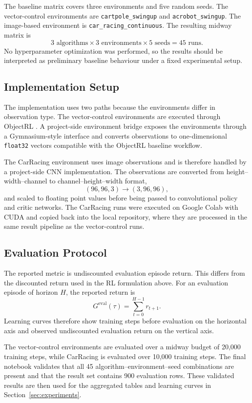 The baseline matrix covers three environments and five random seeds. The vector-control environments are \texttt{cartpole\_swingup} and \texttt{acrobot\_swingup}. The image-based environment is \texttt{car\_racing\_continuous}. The resulting midway matrix is
\[
3 \text{ algorithms} \times 3 \text{ environments} \times 5 \text{ seeds} = 45 \text{ runs}.
\]
No hyperparameter optimization was performed, so the results should be interpreted as preliminary baseline behaviour under a fixed experimental setup.

\subsection{Implementation Setup}
\label{sec:methodology-implementation}

The implementation uses two paths because the environments differ in observation type. The vector-control environments are executed through ObjectRL \citep{baykal2025objectrl}. A project-side environment bridge exposes the environments through a Gymnasium-style interface and converts observations to one-dimensional \texttt{float32} vectors compatible with the ObjectRL baseline workflow.

The CarRacing environment uses image observations and is therefore handled by a project-side CNN implementation. The observations are converted from height--width--channel to channel--height--width format,
\[
(96,96,3) \rightarrow (3,96,96),
\]
and scaled to floating point values before being passed to convolutional policy and critic networks. The CarRacing runs were executed on Google Colab with CUDA and copied back into the local repository, where they are processed in the same result pipeline as the vector-control runs.

\subsection{Evaluation Protocol}
\label{sec:methodology-protocol}

The reported metric is undiscounted evaluation episode return. This differs from the discounted return used in the RL formulation above. For an evaluation episode of horizon $H$, the reported return is
\[
G^{\mathrm{eval}}(\tau)=\sum_{t=0}^{H-1} r_{t+1}.
\]
Learning curves therefore show training steps before evaluation on the horizontal axis and observed undiscounted evaluation return on the vertical axis.

The vector-control environments are evaluated over a midway budget of 20,000 training steps, while CarRacing is evaluated over 10,000 training steps. The final notebook validates that all 45 algorithm--environment--seed combinations are present and that the result set contains 900 evaluation rows. These validated results are then used for the aggregated tables and learning curves in Section~\ref{sec:experiments}.

